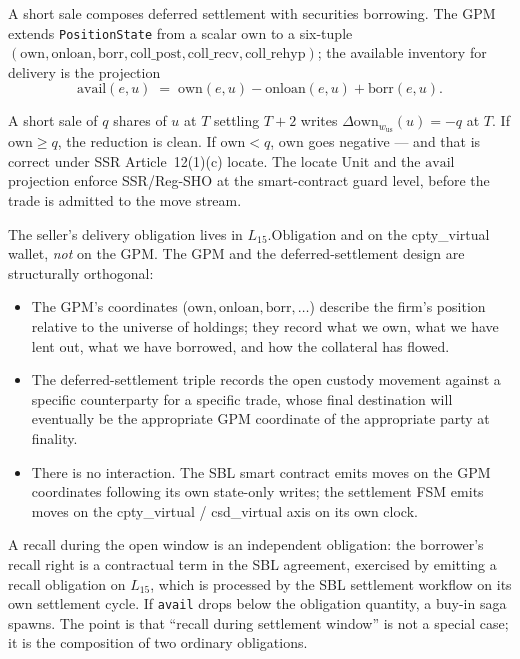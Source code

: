 \documentclass[11pt,a4paper]{article}
\begin{document}
A short sale composes deferred settlement with securities borrowing. The GPM extends \texttt{PositionState} from a scalar $\mathrm{own}$ to a six-tuple $(\mathrm{own}, \mathrm{onloan}, \mathrm{borr}, \mathrm{coll\_post}, \mathrm{coll\_recv}, \mathrm{coll\_rehyp})$; the available inventory for delivery is the projection
\[
\mathrm{avail}(e, u) \;=\; \mathrm{own}(e, u) - \mathrm{onloan}(e, u) + \mathrm{borr}(e, u).
\]

A short sale of $q$ shares of $u$ at $T$ settling $T+2$ writes $\Delta \mathrm{own}_{w_{\mathrm{us}}}(u) = -q$ at $T$. If $\mathrm{own} \geq q$, the reduction is clean. If $\mathrm{own} < q$, $\mathrm{own}$ goes negative --- and that is correct under SSR Article~12(1)(c) locate. The locate Unit and the $\mathrm{avail}$ projection enforce SSR/Reg-SHO at the smart-contract guard level, before the trade is admitted to the move stream.

The seller's delivery obligation lives in $L_{15}.\mathrm{Obligation}$ and on the cpty\_virtual wallet, \emph{not} on the GPM. The GPM and the deferred-settlement design are structurally orthogonal:

\begin{itemize}[nosep]
\item The GPM's coordinates ($\mathrm{own}, \mathrm{onloan}, \mathrm{borr}, \ldots$) describe the firm's position relative to the universe of holdings; they record what we own, what we have lent out, what we have borrowed, and how the collateral has flowed.
\item The deferred-settlement triple records the open custody movement against a specific counterparty for a specific trade, whose final destination will eventually be the appropriate GPM coordinate of the appropriate party at finality.
\item There is no interaction. The SBL smart contract emits moves on the GPM coordinates following its own state-only writes; the settlement FSM emits moves on the cpty\_virtual / csd\_virtual axis on its own clock.
\end{itemize}

A recall during the open window is an independent obligation: the borrower's recall right is a contractual term in the SBL agreement, exercised by emitting a recall obligation on $L_{15}$, which is processed by the SBL settlement workflow on its own settlement cycle. If \texttt{avail} drops below the obligation quantity, a buy-in saga spawns. The point is that ``recall during settlement window'' is not a special case; it is the composition of two ordinary obligations.
\end{document}
